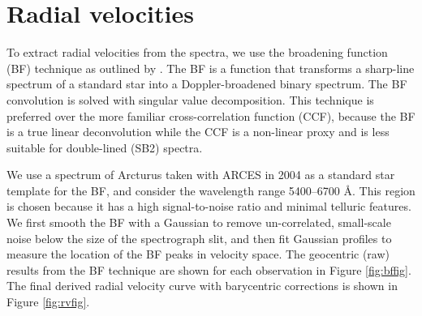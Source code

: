 \section{Radial velocities}\label{rvs}
To extract radial velocities from the spectra, we use the broadening function (BF) technique as outlined by \citet{ruc02}. The BF is a function that transforms a sharp-line spectrum of a standard star into a Doppler-broadened binary spectrum. The BF convolution is solved with singular value decomposition. This technique is preferred over the more familiar cross-correlation function (CCF), because the BF is a true linear deconvolution while the CCF is a non-linear proxy and is less suitable for double-lined (SB2) spectra.

We use a spectrum of Arcturus taken with ARCES in 2004 as a standard star template for the BF, and consider the wavelength range 5400--6700 \AA. This region is chosen because it has a high signal-to-noise ratio and minimal telluric features. We first smooth the BF with a Gaussian to remove un-correlated, small-scale noise below the size of the spectrograph slit, and then fit Gaussian profiles to measure the location of the BF peaks in velocity space. The geocentric (raw) results from the BF technique are shown for each observation in Figure \ref{fig:bffig}. The final derived radial velocity curve with barycentric corrections is shown in Figure \ref{fig:rvfig}.
